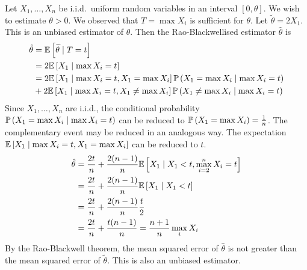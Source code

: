 \begin{example}
	Let $X_1, \dots, X_n$ be i.i.d.\ uniform random variables in an interval $[0, \theta]$.
	We wish to estimate $\theta > 0$.
	We observed that $T = \max X_i$ is sufficient for $\theta$.
	Let $\widetilde \theta = 2 X_1$.
	This is an unbiased estimator of $\theta$.
	Then the Rao-Blackwellised estimator $\hat \theta$ is
	\begin{align*}
		\hat \theta & = \mathbb{E}\left[{\widetilde \theta \mid T = t}\right] \\
		& = 2 \mathbb{E}\left[{X_1 \mid \max X_i = t}\right] \\
		& = 2 \mathbb{E}\left[{X_1 \mid \max X_i = t, X_1 = \max X_i}\right] \mathbb{P}\left({X_1 = \max X_i \mid \max X_i = t}\right) \\
		& + 2 \mathbb{E}\left[{X_1 \mid \max X_i = t, X_1 \neq \max X_i}\right] \mathbb{P}\left({X_1 \neq \max X_i \mid \max X_i = t}\right) \\
	\end{align*}
	Since $X_1, \dots, X_n$ are i.i.d., the conditional probability $\mathbb{P}\left({X_1 = \max X_i \mid \max X_i = t}\right)$ can be reduced to $\mathbb{P}\left({X_1 = \max X_i}\right) = \frac{1}{n}$.
	The complementary event may be reduced in an analogous way.
	The expectation $\mathbb{E}\left[{X_1 \mid \max X_i = t, X_1 = \max X_i}\right]$ can be reduced to $t$.
	\begin{align*}
		\hat \theta & = \frac{2t}{n} + \frac{2(n-1)}{n} \mathbb{E}\left[{X_1 \mid X_1 < t, \max_{i=2}^n X_i = t}\right] \\
		            & = \frac{2t}{n} + \frac{2(n-1)}{n} \mathbb{E}\left[{X_1 \mid X_1 < t}\right]                       \\
		            & = \frac{2t}{n} + \frac{2(n-1)}{n} \frac{t}{2}                                     \\
		            & = \frac{2t}{n} + \frac{t(n-1)}{n} = \frac{n+1}{n} \max_i X_i
	\end{align*}
	By the Rao-Blackwell theorem, the mean squared error of $\hat \theta$ is not greater than the mean squared error of $\widetilde \theta$.
	This is also an unbiased estimator.
\end{example}

